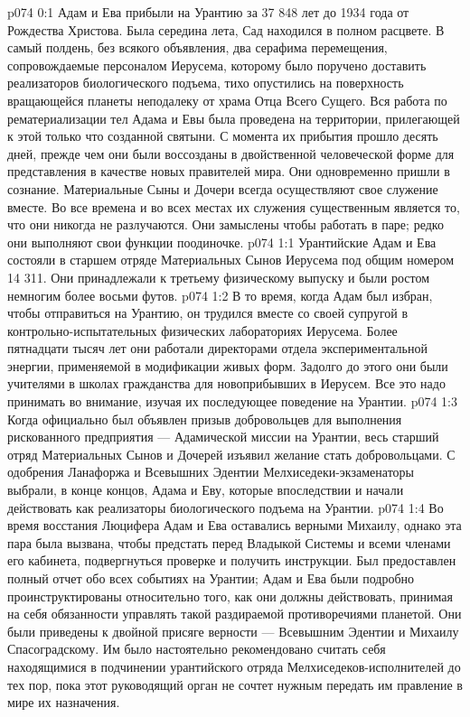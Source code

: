 \author{Солония}
\vs p074 0:1 Адам и Ева прибыли на Урантию за 37 848 лет до 1934 года от Рождества Христова. Была середина лета, Сад находился в полном расцвете. В самый полдень, без всякого объявления, два серафима перемещения, сопровождаемые персоналом Иерусема, которому было поручено доставить реализаторов биологического подъема, тихо опустились на поверхность вращающейся планеты неподалеку от храма Отца Всего Сущего. Вся работа по рематериализации тел Адама и Евы была проведена на территории, прилегающей к этой только что созданной святыни. С момента их прибытия прошло десять дней, прежде чем они были воссозданы в двойственной человеческой форме для представления в качестве новых правителей мира. Они одновременно пришли в сознание. Материальные Сыны и Дочери всегда осуществляют свое служение вместе. Во все времена и во всех местах их служения существенным является то, что они никогда не разлучаются. Они замыслены чтобы работать в паре; редко они выполняют свои функции поодиночке.
\vs p074 1:1 Урантийские Адам и Ева состояли в старшем отряде Материальных Сынов Иерусема под общим номером 14 311. Они принадлежали к третьему физическому выпуску и были ростом немногим более восьми футов.
\vs p074 1:2 В то время, когда Адам был избран, чтобы отправиться на Урантию, он трудился вместе со своей супругой в контрольно\hyp{}испытательных физических лабораториях Иерусема. Более пятнадцати тысяч лет они работали директорами отдела экспериментальной энергии, применяемой в модификации живых форм. Задолго до этого они были учителями в школах гражданства для новоприбывших в Иерусем. Все это надо принимать во внимание, изучая их последующее поведение на Урантии.
\vs p074 1:3 Когда официально был объявлен призыв добровольцев для выполнения рискованного предприятия --- Адамической миссии на Урантии, весь старший отряд Материальных Сынов и Дочерей изъявил желание стать добровольцами. С одобрения Ланафоржа и Всевышних Эдентии Мелхиседеки\hyp{}экзаменаторы выбрали, в конце концов, Адама и Еву, которые впоследствии и начали действовать как реализаторы биологического подъема на Урантии.
\vs p074 1:4 Во время восстания Люцифера Адам и Ева оставались верными Михаилу, однако эта пара была вызвана, чтобы предстать перед Владыкой Системы и всеми членами его кабинета, подвергнуться проверке и получить инструкции. Был предоставлен полный отчет обо всех событиях на Урантии; Адам и Ева были подробно проинструктированы относительно того, как они должны действовать, принимая на себя обязанности управлять такой раздираемой противоречиями планетой. Они были приведены к двойной присяге верности --- Всевышним Эдентии и Михаилу Спасоградскому. Им было настоятельно рекомендовано считать себя находящимися в подчинении урантийского отряда Мелхиседеков\hyp{}исполнителей до тех пор, пока этот руководящий орган не сочтет нужным передать им правление в мире их назначения.
